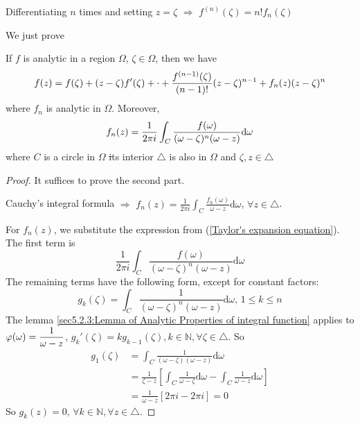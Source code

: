 Differentiating  $ n $ times and setting  $ z=\zeta $ $ \Rightarrow $ $ f^{(n)}(\zeta) =n!f_n(\zeta)$    

We just prove 
\begin{theorem}\label{Taylor's Theorem}
    If  $ f $ is analytic in a region  $ \Omega $,  $ \zeta\in\Omega $, then we have 
    \begin{equation}
        f(z)=f(\zeta)+(z-\zeta)f'(\zeta)+\cdot+\displaystyle\frac{f^{(n-1)}(\zeta)}{(n-1)!}(z-\zeta)^{n-1}+f_n(z)(z-\zeta)^n\label{Taylor's expansion equation}
    \end{equation}   
    where  $ f_n $ is analytic in  $ \Omega $. Moreover,
    \begin{equation}
        f_n(z)=\displaystyle\frac{1}{2\pi i}\int_C\frac{f(\omega)}{(\omega-\zeta)^n(\omega-z)}\mathrm{d}\omega
    \end{equation}  
    where  $ C $ is a circle in  $ \Omega $ \st  its interior  $ \triangle $ is also in  $ \Omega $ and  $ \zeta,z\in \triangle $     
\end{theorem}
\begin{proof}
    It suffices to prove the second part.
    
    Cauchy's integral formula $ \Rightarrow  $ $ f_n(z)=\frac{1}{2\pi i}\int_C\frac{f_n(\omega)}{\omega-z}\mathrm{d}\omega $, $ \forall z\in\triangle $.
    
    For  $ f_n(z) $, we substitute the expression from  (\ref{Taylor's expansion equation}). The first term is 
    \begin{equation}
        \frac{1}{2\pi i}\int_C\frac{f(\omega)}{(\omega-\zeta)^n(\omega-z)}\mathrm{d}\omega
    \end{equation}
    The remaining terms have the following form, except for constant factors:
    \begin{equation}
        g_k(\zeta)=\int_C\frac{1}{(\omega-\zeta)^n(\omega-z)}\mathrm{d}\omega,\,1 \leq k \leq n
    \end{equation}
    The lemma \ref{sec5.2.3:Lemma of Analytic Properties of integral function} applies to  $ \varphi(\omega)=\displaystyle\frac{1}{\omega-z} $,  $ g_k'(\zeta)=kg_{k-1}(\zeta),k\in\mathbb{N},\forall \zeta\in\triangle $. So 
    \begin{equation}
        \begin{aligned}
            g_1(\zeta)&=\int_C\frac{1}{(\omega-\zeta)(\omega-z)}\mathrm{d}\omega\\
            &=\frac{1}{\zeta-z}\left[\int_C\frac{1}{\omega-\zeta}\mathrm{d}\omega-\int_C\frac{1}{\omega-z}\mathrm{d}\omega\right]\\
            &=\frac{1}{\omega-z}[2\pi i-2\pi i]=0
        \end{aligned}
    \end{equation}  
    So  $ g_k(z)=0,\,\forall k\in\mathbb{N},\forall z\in\triangle $. 
\end{proof}
